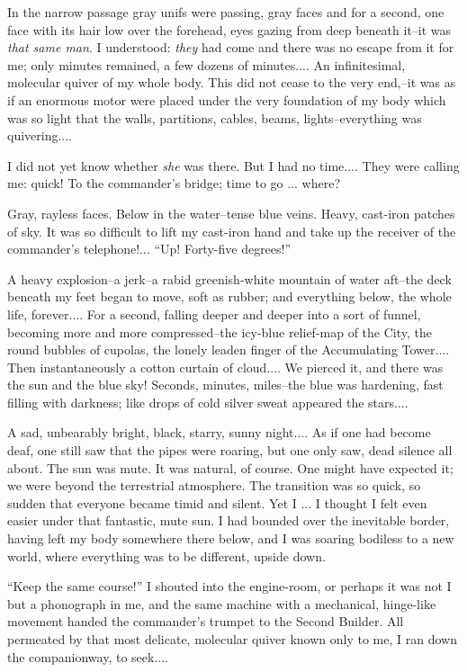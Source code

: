\documentclass[11pt,openany]{book}
\begin{document}
In the narrow passage gray unifs were passing, gray faces and for a second, one face with its hair low over the forehead, eyes gazing from deep beneath it--it was \emph{that same man}. I understood: \emph{they} had come and there was no escape from it for me; only minutes remained, a few dozens of minutes.... An infinitesimal, molecular quiver of my whole body. This did not cease to the very end,--it was as if an enormous motor were placed under the very foundation of my body which was so light that the walls, partitions, cables, beams, lights--everything was quivering....

I did not yet know whether \emph{she} was there. But I had no time.... They were calling me: quick! To the commander's bridge; time to go ... where?

Gray, rayless faces. Below in the water--tense blue veins. Heavy, cast-iron patches of sky. It was so difficult to lift my cast-iron hand and take up the receiver of the commander's telephone!... ``Up! Forty-five degrees!''

A heavy explosion--a jerk--a rabid greenish-white mountain of water aft--the deck beneath my feet began to move, soft as rubber; and everything below, the whole life, forever.... For a second, falling deeper and deeper into a sort of funnel, becoming more and more compressed--the icy-blue relief-map of the City, the round bubbles of cupolas, the lonely leaden finger of the Accumulating Tower.... Then instantaneously a cotton curtain of cloud.... We pierced it, and there was the sun and the blue sky! Seconds, minutes, miles--the blue was hardening, fast filling with darkness; like drops of cold silver sweat appeared the stars....

A sad, unbearably bright, black, starry, sunny night.... As if one had become deaf, one still saw that the pipes were roaring, but one only saw, dead silence all about. The sun was mute. It was natural, of course. One might have expected it; we were beyond the terrestrial atmosphere. The transition was so quick, so sudden that everyone became timid and silent. Yet I ... I thought I felt even easier under that fantastic, mute sun. I had bounded over the inevitable border, having left my body somewhere there below, and I was soaring bodiless to a new world, where everything was to be different, upside down.

``Keep the same course!'' I shouted into the engine-room, or perhaps it was not I but a phonograph in me, and the same machine with a mechanical, hinge-like movement handed the commander's trumpet to the Second Builder. All permeated by that most delicate, molecular quiver known only to me, I ran down the companionway, to seek....
\end{document}
